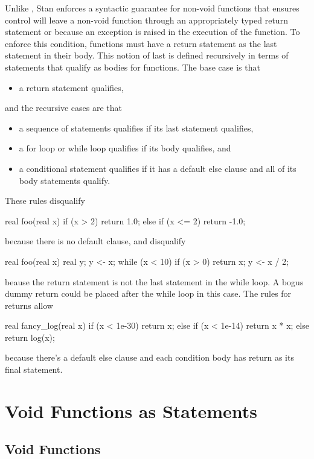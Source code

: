 Unlike \Cpp, Stan enforces a syntactic guarantee for non-void
functions that ensures control will leave a non-void function through
an appropriately typed return statement or because an exception is
raised in the execution of the function.  To enforce this condition,
functions must have a return statement as the last statement in their
body.  This notion of last is defined recursively in terms of
statements that qualify as bodies for functions.  The base case is that
%
\begin{itemize}
\item a return statement qualifies,
\end{itemize}
%
and the recursive cases are that
%
\begin{itemize}
\item a sequence of statements qualifies if its last statement
  qualifies,
\item a for loop or while loop qualifies if its body qualifies, and
\item a conditional statement qualifies if it has a default else
  clause and all of its body statements qualify.
\end{itemize}
%
These rules disqualify
%
\begin{stancode}
real foo(real x) {
  if (x > 2) return 1.0;
  else if (x <= 2) return -1.0;
}
\end{stancode}
%
because there is no default  clause, and
disqualify
%
\begin{stancode}
real foo(real x) {
  real y;
  y <- x;
  while (x < 10) {
    if (x > 0) return x;
    y <- x / 2;
  }
}
\end{stancode}
%
beause the return statement is not the last statement in the while
loop.  A bogus dummy return could be placed after the while loop in
this case.  The rules for returns allow
%
\begin{stancode}
real fancy_log(real x) {
  if (x < 1e-30)
    return x;
  else if (x < 1e-14)
    return x * x;
  else
    return log(x);
}
\end{stancode}
%
because there's a default else clause and each condition body has
return as its final statement.


\section{Void Functions as Statements}

\subsection{Void Functions}

